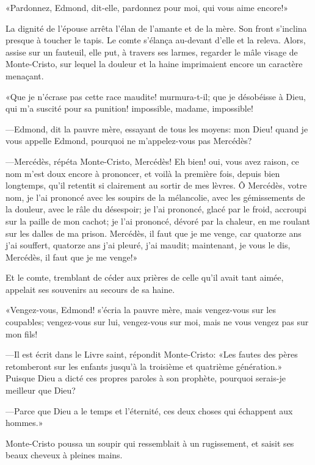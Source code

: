 «Pardonnez, Edmond, dit-elle, pardonnez pour moi, qui vous aime encore!» 

La dignité de l'épouse arrêta l'élan de l'amante et de la mère. Son front s'inclina presque à toucher le tapis. Le comte s'élança au-devant d'elle et la releva. Alors, assise sur un fauteuil, elle put, à travers ses larmes, regarder le mâle visage de Monte-Cristo, sur lequel la douleur et la haine imprimaient encore un caractère menaçant. 

«Que je n'écrase pas cette race maudite! murmura-t-il; que je désobéisse à Dieu, qui m'a suscité pour sa punition! impossible, madame, impossible! 

—Edmond, dit la pauvre mère, essayant de tous les moyens: mon Dieu! quand je vous appelle Edmond, pourquoi ne m'appelez-vous pas Mercédès? 

—Mercédès, répéta Monte-Cristo, Mercédès! Eh bien! oui, vous avez raison, ce nom m'est doux encore à prononcer, et voilà la première fois, depuis bien longtemps, qu'il retentit si clairement au sortir de mes lèvres. Ô Mercédès, votre nom, je l'ai prononcé avec les soupirs de la mélancolie, avec les gémissements de la douleur, avec le râle du désespoir; je l'ai prononcé, glacé par le froid, accroupi sur la paille de mon cachot; je l'ai prononcé, dévoré par la chaleur, en me roulant sur les dalles de ma prison. Mercédès, il faut que je me venge, car quatorze ans j'ai souffert, quatorze ans j'ai pleuré, j'ai maudit; maintenant, je vous le dis, Mercédès, il faut que je me venge!» 

Et le comte, tremblant de céder aux prières de celle qu'il avait tant aimée, appelait ses souvenirs au secours de sa haine. 

«Vengez-vous, Edmond! s'écria la pauvre mère, mais vengez-vous sur les coupables; vengez-vous sur lui, vengez-vous sur moi, mais ne vous vengez pas sur mon fils! 

—Il est écrit dans le Livre saint, répondit Monte-Cristo: «Les fautes des pères retomberont sur les enfants jusqu'à la troisième et quatrième génération.» Puisque Dieu a dicté ces propres paroles à son prophète, pourquoi serais-je meilleur que Dieu? 

—Parce que Dieu a le temps et l'éternité, ces deux choses qui échappent aux hommes.» 

Monte-Cristo poussa un soupir qui ressemblait à un rugissement, et saisit ses beaux cheveux à pleines mains. 


